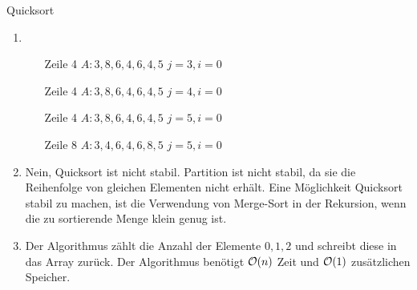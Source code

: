 \documentclass{article}
\begin{document}
\begin{exercise}{Quicksort}
  \begin{solution}
    \begin{enumerate}
      \item
            \begin{itemize}
              \item[Zeile 4] $A: 3, 8, 6, 4, 6, 4, 5$ \hfill $j = 3, i = 0$
              \item[Zeile 4] $A: 3, 8, 6, 4, 6, 4, 5$ \hfill $j = 4, i = 0$
              \item[Zeile 4] $A: 3, 8, 6, 4, 6, 4, 5$ \hfill $j = 5, i = 0$
              \item[Zeile 8] $A: 3, 4, 6, 4, 6, 8, 5$ \hfill $j = 5, i = 0$
            \end{itemize}
      \item Nein, Quicksort ist nicht stabil. Partition ist nicht stabil, da sie die Reihenfolge von gleichen Elementen nicht erhält. Eine Möglichkeit Quicksort stabil zu machen, ist die Verwendung von Merge-Sort in der Rekursion, wenn die zu sortierende Menge klein genug ist.
      \item Der Algorithmus zählt die Anzahl der Elemente $0,1,2$ und schreibt diese in das Array zurück. Der Algorithmus benötigt $\mathcal{O}(n)$ Zeit und $\mathcal{O}(1)$ zusätzlichen Speicher.
    \end{enumerate}
  \end{solution}
\end{exercise}
\end{document}
